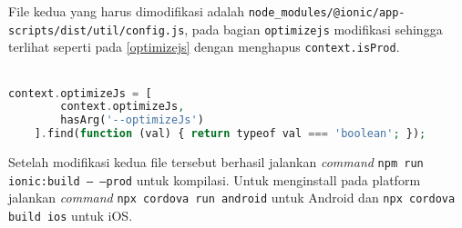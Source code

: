 File kedua yang harus dimodifikasi adalah \texttt{node\_modules/@ionic/app-scripts/dist/util/config.js}, pada bagian \texttt{optimizejs} modifikasi sehingga terlihat seperti pada \mbox{\ref{optimizejs}} dengan menghapus \texttt{context.isProd}.
\\
\\

\begin{lstlisting}[frame=single, label={optimizejs}, language=PHP, caption= \texttt{optimizejs} setelah modifikasi]
context.optimizeJs = [
        context.optimizeJs,
        hasArg('--optimizeJs')
    ].find(function (val) { return typeof val === 'boolean'; });
\end{lstlisting}
Setelah modifikasi kedua file tersebut berhasil jalankan \textit{command} \texttt{npm run ionic:build -- --prod} untuk kompilasi. Untuk menginstall pada platform jalankan \textit{command} \texttt{npx cordova run android} untuk Android dan \texttt{npx cordova build ios} untuk iOS.
